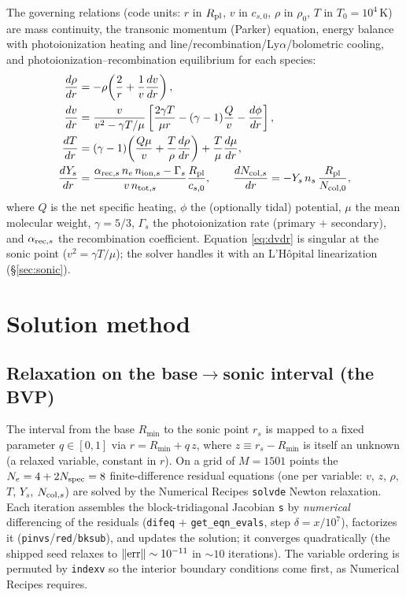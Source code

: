 \documentclass[english,a4paper]{my_memo}
\newcommand{\Rp}{\ensuremath{R_{\rm pl}}}
\newcommand{\code}[1]{\texttt{#1}}
\begin{document}
The governing relations (code units: $r$ in \Rp, $v$ in $c_{s,0}$,
$\rho$ in $\rho_0$, $T$ in $T_0=10^4$\,K) are mass continuity, the
transonic momentum (Parker) equation, energy balance with photoionization
heating and line/recombination/Ly$\alpha$/bolometric cooling, and
photoionization--recombination equilibrium for each species:
\begin{align}
\frac{d\rho}{dr} &= -\rho\!\left(\frac{2}{r}+\frac{1}{v}\frac{dv}{dr}\right),\\
\frac{dv}{dr} &= \frac{v}{v^2-\gamma T/\mu}
   \left[\frac{2\gamma T}{\mu r}-(\gamma-1)\frac{Q}{v}-\frac{d\phi}{dr}\right],
   \label{eq:dvdr}\\
\frac{dT}{dr} &= (\gamma-1)\!\left(\frac{Q\mu}{v}+\frac{T}{\rho}\frac{d\rho}{dr}\right)
   +\frac{T}{\mu}\frac{d\mu}{dr},\\
\frac{dY_s}{dr} &= \frac{\alpha_{{\rm rec},s}\,n_e\,n_{{\rm ion},s}
   -\Gamma_s}{v\,n_{{\rm tot},s}}\frac{R_{\rm pl}}{c_{s,0}},\qquad
\frac{dN_{{\rm col},s}}{dr} = -Y_s\,n_s\,\frac{R_{\rm pl}}{N_{\rm col,0}},
\end{align}
where $Q$ is the net specific heating, $\phi$ the (optionally tidal)
potential, $\mu$ the mean molecular weight, $\gamma=5/3$,
$\Gamma_s$ the photoionization rate (primary $+$ secondary), and
$\alpha_{{\rm rec},s}$ the recombination coefficient. Equation
\eqref{eq:dvdr} is singular at the sonic point ($v^2=\gamma T/\mu$); the
solver handles it with an L'H\^opital linearization (\S\ref{sec:sonic}).

\section{Solution method}

\subsection{Relaxation on the base$\to$sonic interval (the BVP)}
The interval from the base $R_{\min}$ to the sonic point $r_s$ is mapped
to a fixed parameter $q\in[0,1]$ via $r=R_{\min}+q\,z$, where $z\equiv
r_s-R_{\min}$ is itself an unknown (a relaxed variable, constant in $r$).
On a grid of $M=1501$ points the $N_e=4+2N_{\rm spec}=8$ finite-difference
residual equations (one per variable: $v$, $z$, $\rho$, $T$, $Y_s$,
$N_{{\rm col},s}$) are solved by the Numerical Recipes \code{solvde}
Newton relaxation. Each iteration assembles the block-tridiagonal
Jacobian \code{s} by \emph{numerical} differencing of the residuals
(\code{difeq} $+$ \code{get\_eqn\_evals}, step $\delta = x/10^{7}$),
factorizes it (\code{pinvs}/\code{red}/\code{bksub}), and updates the
solution; it converges quadratically (the shipped seed relaxes to
$\|{\rm err}\|\sim10^{-11}$ in $\sim10$ iterations). The variable
ordering is permuted by \code{indexv} so the interior boundary conditions
come first, as Numerical Recipes requires.
\end{document}
